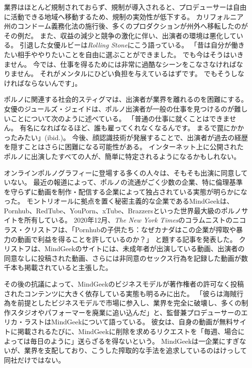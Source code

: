 \documentclass[paper=a4,book,openany]{jlreq}
\begin{document}
業界はほとんど規制されておらず、規制が導入されると、プロデューサーは自由に活動できる地域へ移動するため、規制の実効性が低下する。
カリフォルニア州のコンドーム義務化法の施行後、多くのプロダクションが州外へ移転したのがその例だ。
また、収益の減少と競争の激化に伴い、出演者の環境は悪化している。
引退した女優ルビーは\emph{Rolling Stone}にこう語っている。
「昔は自分が働きたい相手ややりたいことを自由に選ぶことができました。
でも今はそうはいきません。
今では、仕事を得るためには非常に過酷なシーンをこなさなければなりません。
それがメンタルにひどい負担を与えているはずです。
でもそうしなければならないんです」\citep{swann18:_is_porn_indus_doing_enoug}。

ポルノに関連する社会的スティグマは、出演者が業界を離れるのを困難にする。
女優のジュールズ・ジェイドは、ポルノ出演者が一般の仕事を見つけるのが難しいことについて次のように述べている。
「普通の仕事に就くことはできません。
有名になればなるほど、誰も雇ってくれなくなるんです。
まるで罠にかかったみたい」(ibid.)。
今後、顔認識技術が発展することで、出演者が過去の経歴を隠すことはさらに困難になる可能性がある。
インターネット上に公開されたポルノに出演したすべての人が、簡単に特定されるようになるかもしれない。

オンラインポルノグラフィーに登場する多くの人々は、そもそも出演に同意していない。
最近の報道によって、ポルノの流通がごく少数の企業、特に倫理基準を守らずに動画を制作・配信する企業によって独占されている実態が明らかになった。
モントリオールに拠点を置く秘密主義的な企業であるMindGeekは、Pornhub、RedTube、YouPorn、xTube、Brazzersといった世界最大級のポルノサイトを所有している。
2020年12月、\emph{The New York Times}のコラムニストのニコラス・クリストフは、「Pornhubの子供たち：なぜカナダはこの企業が搾取や暴力の動画で利益を得ることを許しているのか？」
と題する記事を発表した\citep{kristof20:_child_pornh}。
クリストフは、MindGeekのサイトには、未成年者が出演している動画、出演者の同意なしに投稿された動画、さらには非同意のセックス行為を記録した動画が数千本も掲載されていると主張した。

その後の抗議によって、MindGeekのビジネスモデルが著作権者の許可なく投稿されたコンテンツに大きく依存している実態も明るみに出た。
「彼らは海賊行為を前提としたビジネスモデルで市場に参入し、業界を完全に破壊し、多くの制作スタジオやパフォーマーを廃業に追い込んだ」と、監督兼プロデューサーのエリカ・ラストはMindGeekについて語っている。
彼女は、自身の動画が無料サイトに掲載されるたびに、MindGeekに削除を求めるリクエストを「毎週、場合によっては毎日のように」送らざるを得ないという\citep{nilsson20:_secret_world_mindg}。
MindGeekは一企業にすぎないが、業界を支配しており、こうした搾取的な手法を追求しているのはけっして同社だけではない。
\end{document}
